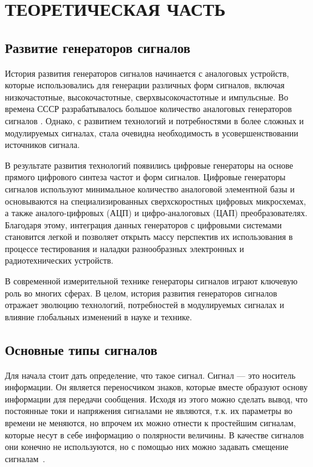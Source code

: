 \chapter{ТЕОРЕТИЧЕСКАЯ ЧАСТЬ}

\section{Развитие генераторов сигналов}
	История развития генераторов сигналов начинается с аналоговых устройств, которые
использовались для генерации различных форм сигналов, включая низкочастотные,
высокочастотные, сверхвысокочастотные и импульсные. Во времена СССР разрабатывалось большое количество аналоговых генераторов сигналов \cite{dgs}. Однако, с развитием технологий и потребностями в более сложных и модулируемых сигналах, стала очевидна необходимость в усовершенствовании источников сигнала.

	В результате развития технологий появились цифровые генераторы на основе прямого цифрового синтеза частот и форм сигналов. Цифровые генераторы сигналов используют минимальное количество аналоговой элементной базы и основываются на специализированных сверхскоростных цифровых микросхемах, а также аналого-цифровых (АЦП) и цифро-аналоговых (ЦАП) преобразователях. Благодаря этому, интеграция данных генераторов с цифровыми системами становится легкой и позволяет открыть массу перспектив их использования в процессе тестирования и наладки разнообразных электронных и радиотехнических устройств. 

	В современной измерительной технике генераторы сигналов играют ключевую роль во многих сферах. %
	В целом, история развития генераторов сигналов отражает эволюцию технологий, потребностей в модулируемых сигналах и влияние глобальных изменений в науке и технике.

\section{Основные типы сигналов}
	Для начала стоит дать определение, что такое сигнал. Сигнал --- это носитель информации. Он является переносчиком знаков, которые вместе образуют основу информации для передачи сообщения. Исходя из этого можно сделать вывод, что постоянные токи и напряжения сигналами не являются, т.к. их параметры во времени не меняются, но впрочем их можно отнести к простейшим сигналам, которые несут в себе информацию о полярности величины. В качестве сигналов они конечно не используются, но с помощью них можно задавать смещение сигналам~\cite{dgs}.

